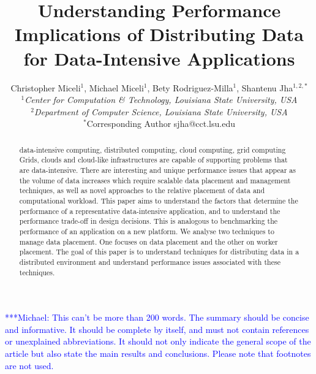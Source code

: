 \documentclass{rspublic}
\title[Understanding Performance Implications of Distributing Data for
Data-Intensive Applications]{Understanding Performance Implications of
Distributing Data for Data-Intensive Applications}
\author[Miceli, Miceli, Rodriguez-Milla, Jha]{ Christopher Miceli$^{1}$,
Michael Miceli$^{1}$, Bety Rodriguez-Milla$^{1}$, Shantenu Jha$^{1,2,*}$ \\
\small{\emph{$^{1}$Center for Computation \& Technology, Louisiana State
University, USA}} \\  \small{\emph{$^{2}$Department of Computer Science,
Louisiana State University, USA}} \\ {\footnotesize {\hspace{0.0 in}
$^*$Corresponding Author sjha@cct.lsu.edu}} }
\newcommand{\micnote}[1]{ {\textcolor{blue} { ***Michael: #1 }}}
\begin{document}
 \maketitle

\micnote{This can't be more than 200 words. The summary should be
concise and informative. It should be complete by itself, and must not
contain references or unexplained abbreviations. It should not only
indicate the general scope of the article but also state the main
results and conclusions. Please note that footnotes are not used.}

\begin{abstract}{data-intensive computing, distributed computing,
    cloud computing, grid computing} 
Grids, clouds and cloud-like infrastructures are capable of supporting
problems that are data-intensive. There are interesting and unique
performance issues that appear as the volume of data increases which
require scalable data placement and management techniques, as well as
novel approaches to the relative placement of data and computational
workload.  This paper aims to understand the factors that
determine the performance of a representative data-intensive
application, and to understand the performance trade-off in design
decisions. This is analogous to benchmarking the performance of an
application on a new platform. We analyse two techniques to manage data
placement. One focuses on data placement and the other on worker
placement. The goal of this paper is to understand techniques for
distributing data in a distributed environment and understand
performance issues associated with these techniques.
\end{abstract}

\end{document}
